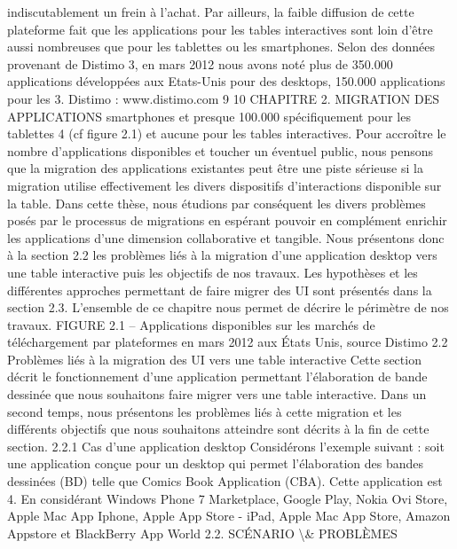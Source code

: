 \documentclass{article}
\begin{document}
indiscutablement un frein \`{a} l’achat. Par ailleurs, la faible diffusion de cette plateforme fait que les
applications pour les tables interactives sont loin d’\^{e}tre aussi nombreuses que pour les tablettes ou
les smartphones. Selon des donn\'{e}es provenant de Distimo 3, en mars 2012 nous avons not\'{e} plus de
350.000 applications d\'{e}velopp\'{e}es aux Etats-Unis pour des desktops, 150.000 applications pour les
3. Distimo : www.distimo.com
9
10
CHAPITRE 2. MIGRATION DES APPLICATIONS
smartphones et presque 100.000 sp\'{e}ciﬁquement pour les tablettes 4 (cf ﬁgure 2.1) et aucune pour les
tables interactives.
Pour accro\^{i}tre le nombre d’applications disponibles et toucher un \'{e}ventuel public, nous pensons
que la migration des applications existantes peut \^{e}tre une piste s\'{e}rieuse si la migration utilise effectivement les divers dispositifs d’interactions disponible sur la table. Dans cette th\`{e}se, nous \'{e}tudions
par cons\'{e}quent les divers probl\`{e}mes pos\'{e}s par le processus de migrations en esp\'{e}rant pouvoir en
compl\'{e}ment enrichir les applications d’une dimension collaborative et tangible.
Nous pr\'{e}sentons donc \`{a} la section 2.2 les probl\`{e}mes li\'{e}s \`{a} la migration d’une application desktop
vers une table interactive puis les objectifs de nos travaux. Les hypoth\`{e}ses et les diff\'{e}rentes approches
permettant de faire migrer des UI sont pr\'{e}sent\'{e}s dans la section 2.3. L’ensemble de ce chapitre nous
permet de d\'{e}crire le p\'{e}rim\`{e}tre de nos travaux.
FIGURE 2.1 – Applications disponibles sur les march\'{e}s de t\'{e}l\'{e}chargement par plateformes en mars
2012 aux États Unis, source Distimo
2.2
Probl\`{e}mes li\'{e}s \`{a} la migration des UI vers une table interactive
Cette section d\'{e}crit le fonctionnement d’une application permettant l’\'{e}laboration de bande dessin\'{e}e que nous souhaitons faire migrer vers une table interactive. Dans un second temps, nous pr\'{e}sentons les probl\`{e}mes li\'{e}s \`{a} cette migration et les diff\'{e}rents objectifs que nous souhaitons atteindre sont
d\'{e}crits \`{a} la ﬁn de cette section.
2.2.1
Cas d’une application desktop
Consid\'{e}rons l’exemple suivant : soit une application con\c{c}ue pour un desktop qui permet l’\'{e}laboration des bandes dessin\'{e}es (BD) telle que Comics Book Application (CBA). Cette application est
4. En consid\'{e}rant Windows Phone 7 Marketplace, Google Play, Nokia Ovi Store, Apple Mac App Iphone, Apple App
Store - iPad, Apple Mac App Store, Amazon Appstore et BlackBerry App World
2.2. SCÉNARIO \textbackslash{}& PROBLÈMES
\end{document}
